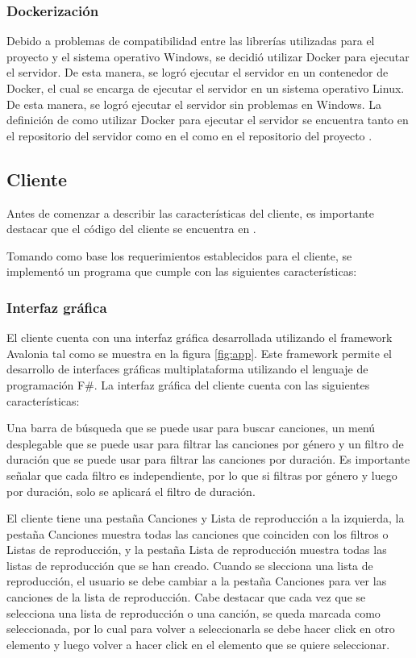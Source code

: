 \subsubsection{Dockerización}

Debido a problemas de compatibilidad entre las librerías utilizadas para el
proyecto y el sistema operativo Windows, se decidió utilizar Docker para
ejecutar el servidor. De esta manera, se logró ejecutar el servidor en un
contenedor de Docker, el cual se encarga de ejecutar el servidor en un sistema
operativo Linux. De esta manera, se logró ejecutar el servidor sin problemas
en Windows. La definición de como utilizar Docker para ejecutar el servidor
se encuentra tanto en el repositorio del servidor \cite{server} como en el
como en el repositorio del proyecto \cite{project}.

\subsection{Cliente}

Antes de comenzar a describir las características del cliente, es importante
destacar que el código del cliente se encuentra en \cite{client}.

Tomando como base los requerimientos establecidos para el cliente, se
implementó un programa que cumple con las siguientes características:

\subsubsection{Interfaz gráfica}

El cliente cuenta con una interfaz gráfica desarrollada utilizando el framework
Avalonia tal como se muestra en la figura \ref{fig:app}. Este framework permite
el desarrollo de interfaces gráficas multiplataforma utilizando el lenguaje de
programación F\#. La interfaz gráfica del cliente cuenta con las siguientes
características:

Una barra de búsqueda que se puede usar para buscar canciones, un menú
desplegable que se puede usar para filtrar las canciones por género y un filtro
de duración que se puede usar para filtrar las canciones por duración. Es
importante señalar que cada filtro es independiente, por lo que si filtras por
género y luego por duración, solo se aplicará el filtro de duración.

El cliente tiene una pestaña Canciones y Lista de reproducción a la izquierda,
la pestaña Canciones muestra todas las canciones que coinciden con los filtros o
Listas de reproducción, y la pestaña Lista de reproducción muestra todas las
listas de reproducción que se han creado. Cuando se slecciona una lista de
reproducción, el usuario se debe cambiar a la pestaña Canciones para ver las
canciones de la lista de reproducción. Cabe destacar que cada 
vez que se selecciona una lista de reproducción o una canción, se queda 
marcada como seleccionada, por lo cual para volver a seleccionarla se debe 
hacer click en otro elemento y luego volver a hacer click en el elemento que 
se quiere seleccionar.

